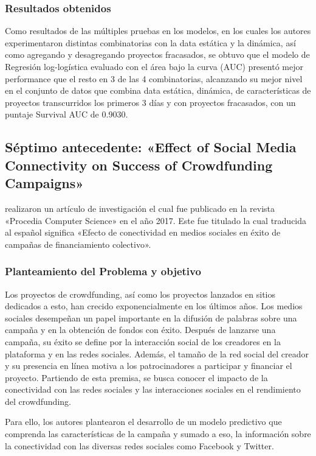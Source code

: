 \subsubsection{Resultados obtenidos}
Como resultados de las múltiples pruebas en los modelos, en los cuales los autores experimentaron distintas combinatorias con la data estática y la dinámica, así como agregando y desagregando proyectos fracasados, se obtuvo que el modelo de Regresión log-logística evaluado con el área bajo la curva (AUC) presentó mejor performance que el resto en 3 de las 4 combinatorias, alcanzando su mejor nivel en el conjunto de datos que combina data estática, dinámica, de características de proyectos transcurridos los primeros 3 días y con proyectos fracasados, con un puntaje Survival AUC de 0.9030.


\subsection{Séptimo antecedente: «Effect of Social Media Connectivity on Success of Crowdfunding Campaigns» \citep*{pr_kaur2017socmedcrowd}}
\citeauthor{pr_kaur2017socmedcrowd} realizaron un artículo de investigación el cual fue publicado en la revista «Procedia Computer Science» en el año 2017. Este fue titulado  la cual traducida al español significa «Efecto de conectividad en medios sociales en éxito de campañas de financiamiento colectivo».

\subsubsection{Planteamiento del Problema y objetivo}
Los proyectos de crowdfunding, así como los proyectos lanzados en sitios dedicados a esto, han crecido exponencialmente en los últimos años. Los medios sociales desempeñan un papel importante en la difusión de palabras sobre una campaña y en la obtención de fondos con éxito. Después de lanzarse una campaña, su éxito se define por la interacción social de los creadores en la plataforma y en las redes sociales. Además, el tamaño de la red social del creador y su presencia en línea motiva a los patrocinadores a participar y financiar el proyecto. Partiendo de esta premisa, se busca conocer el impacto de la conectividad con las redes sociales y las interacciones sociales en el rendimiento del crowdfunding.

Para ello, los autores plantearon el desarrollo de un modelo predictivo que comprenda las características de la campaña y sumado a eso, la información sobre la conectividad con las diversas redes sociales como Facebook y Twitter.

